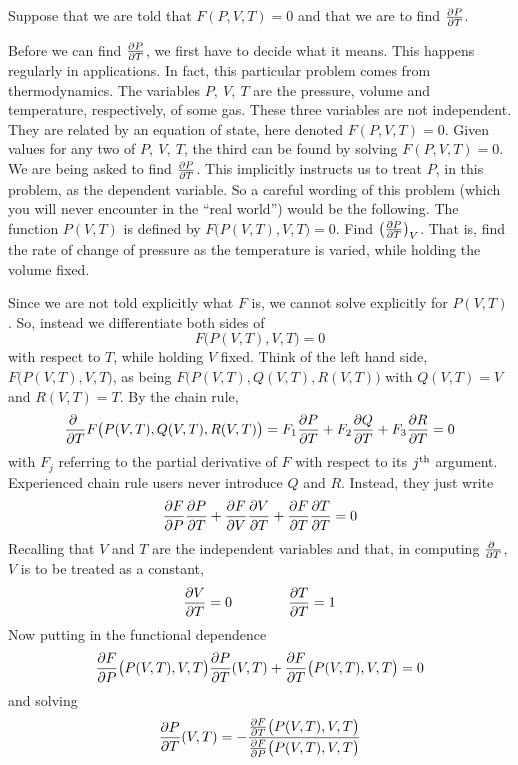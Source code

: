 \begin{eg}\label{eg:chainRuleD} 
Suppose that we are told that $F(P,V,T)=0$ and 
that we are to find  $\pdiff{P}{T}$.

Before we can find $\pdiff{P}{T}$, we first have to decide what it means.
This happens regularly in applications. In fact, this particular problem
comes from thermodynamics. The variables $P,\ V,\ T$ are the pressure,
volume and temperature, respectively, of some gas. These three variables
are not independent. They are related by an equation of state, here denoted
$F(P,V,T)=0$. Given values for any two of $P,\ V,\ T$, the third can be
found by solving $F(P,V,T)=0$. We are being asked to find 
$\pdiff{P}{T}$. This implicitly instructs us to treat
$P$, in this problem, as the dependent variable. So a careful wording of
this problem (which you will never encounter in the ``real world'') would
be the following. The function $P(V,T)$ is defined by $F\big(P(V,T),V,T)=0$.
Find $\big(\pdiff{P}{T}\big)_V$. That is, find the rate of change of
pressure as the temperature is varied, while holding the volume fixed.

Since we are not told explicitly what $F$ is, we cannot solve explicitly
for $P(V,T)$. So, instead we differentiate both sides of 
$$
F\big(P(V,T),V,T\big)=0
$$
with respect to $T$, while holding $V$ fixed. Think of the left hand side,
$F\big(P(V,T),V,T\big)$, as being $F\big(P(V,T),Q(V,T),R(V,T)\big)$
with $Q(V,T)=V$ and $R(V,T)=T$. By the chain rule,
$$
\pdiff{}{T}F\big(P(V,T),Q(V,T),R(V,T)\big)
=F_1\pdiff{P}{T}
+F_2\pdiff{Q}{T}
+F_3\pdiff{R}{T}=0
$$
with $F_j$ referring to the partial derivative of $F$ with respect to its
$j^{\rm th}$ argument.
Experienced chain rule users never introduce $Q$ and $R$. Instead, 
they just write
$$
\pdiff{F}{P}\pdiff{P}{T}
+\pdiff{F}{V}\pdiff{V}{T}
+\pdiff{F}{T}\pdiff{T}{T}=0
$$
Recalling that $V$ and $T$ are the independent variables and that, in computing
$\pdiff{}{T}$, $V$ is to be treated as a constant,
$$
\pdiff{V}{T}=0\qquad\qquad \pdiff{T}{T} = 1
$$
Now putting in the functional dependence
$$
\pdiff{F}{P}\big(P(V,T),V,T\big)
\pdiff{P}{T}(V,T)
+\pdiff{F}{T}\big(P(V,T),V,T\big)=0
$$
and solving
$$
\pdiff{P}{T}(V,T)
=-\frac{\pdiff{F}{T}\big(P(V,T),V,T\big)}
{\pdiff{F}{P}\big(P(V,T),V,T\big)}
$$
\end{eg}

